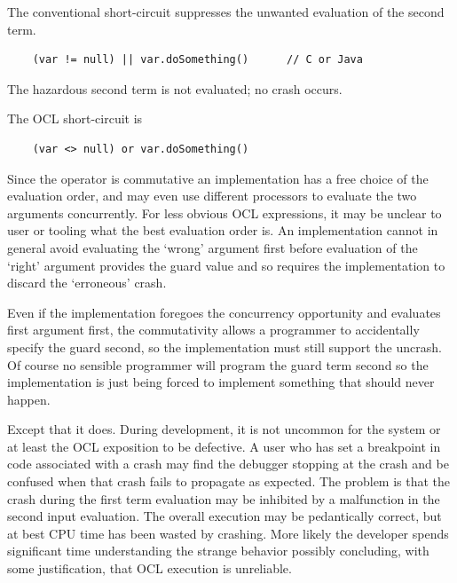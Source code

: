 \documentclass[
]{ceurart}
\begin{document}
The conventional short-circuit suppresses the unwanted evaluation of the second term.

\begin{verbatim}
    (var != null) || var.doSomething()		// C or Java
\end{verbatim}

The hazardous second term is not evaluated; no crash occurs.

The OCL short-circuit is

\begin{verbatim}
    (var <> null) or var.doSomething()
\end{verbatim}

Since the operator is commutative an implementation has a free choice of the evaluation order, and may even use different processors to evaluate the two arguments concurrently. For less obvious OCL expressions, it may be unclear to user or tooling what the best evaluation order is. An implementation cannot in general avoid evaluating the `wrong' argument first before evaluation of the `right' argument provides the guard value and so requires the implementation to discard the `erroneous' crash.

Even if the implementation foregoes the concurrency opportunity and evaluates first argument first, the commutativity allows a programmer to accidentally specify the guard second, so the implementation must still support the uncrash. Of course no sensible programmer will program the guard term second so the implementation is just being forced to implement something that should never happen.

Except that it does. During development, it is not uncommon for the system or at least the OCL exposition to be defective. A user who has set a breakpoint in code associated with a crash may find the debugger stopping at the crash and be confused when that crash fails to propagate as expected. The problem is that  the crash during the first term evaluation may be inhibited by a malfunction in the second input evaluation. The overall execution may be pedantically correct, but at best CPU time has been wasted by crashing. More likely the developer spends significant time understanding the strange behavior possibly concluding, with some justification, that OCL execution is unreliable.

\end{document}
